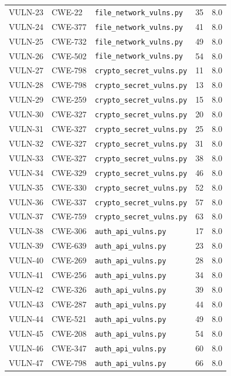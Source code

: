 \documentclass[11pt,a4paper]{article}
\begin{document}
\begin{longtable}{@{}l l l r l@{}}
VULN-23 & CWE-22 & \texttt{file\_network\_vulns.py} & 35 & 8.0 \\
VULN-24 & CWE-377 & \texttt{file\_network\_vulns.py} & 41 & 8.0 \\
VULN-25 & CWE-732 & \texttt{file\_network\_vulns.py} & 49 & 8.0 \\
VULN-26 & CWE-502 & \texttt{file\_network\_vulns.py} & 54 & 8.0 \\
VULN-27 & CWE-798 & \texttt{crypto\_secret\_vulns.py} & 11 & 8.0 \\
VULN-28 & CWE-798 & \texttt{crypto\_secret\_vulns.py} & 13 & 8.0 \\
VULN-29 & CWE-259 & \texttt{crypto\_secret\_vulns.py} & 15 & 8.0 \\
VULN-30 & CWE-327 & \texttt{crypto\_secret\_vulns.py} & 20 & 8.0 \\
VULN-31 & CWE-327 & \texttt{crypto\_secret\_vulns.py} & 25 & 8.0 \\
VULN-32 & CWE-327 & \texttt{crypto\_secret\_vulns.py} & 31 & 8.0 \\
VULN-33 & CWE-327 & \texttt{crypto\_secret\_vulns.py} & 38 & 8.0 \\
VULN-34 & CWE-329 & \texttt{crypto\_secret\_vulns.py} & 46 & 8.0 \\
VULN-35 & CWE-330 & \texttt{crypto\_secret\_vulns.py} & 52 & 8.0 \\
VULN-36 & CWE-337 & \texttt{crypto\_secret\_vulns.py} & 57 & 8.0 \\
VULN-37 & CWE-759 & \texttt{crypto\_secret\_vulns.py} & 63 & 8.0 \\
VULN-38 & CWE-306 & \texttt{auth\_api\_vulns.py} & 17 & 8.0 \\
VULN-39 & CWE-639 & \texttt{auth\_api\_vulns.py} & 23 & 8.0 \\
VULN-40 & CWE-269 & \texttt{auth\_api\_vulns.py} & 28 & 8.0 \\
VULN-41 & CWE-256 & \texttt{auth\_api\_vulns.py} & 34 & 8.0 \\
VULN-42 & CWE-326 & \texttt{auth\_api\_vulns.py} & 39 & 8.0 \\
VULN-43 & CWE-287 & \texttt{auth\_api\_vulns.py} & 44 & 8.0 \\
VULN-44 & CWE-521 & \texttt{auth\_api\_vulns.py} & 49 & 8.0 \\
VULN-45 & CWE-208 & \texttt{auth\_api\_vulns.py} & 54 & 8.0 \\
VULN-46 & CWE-347 & \texttt{auth\_api\_vulns.py} & 60 & 8.0 \\
VULN-47 & CWE-798 & \texttt{auth\_api\_vulns.py} & 66 & 8.0 \\

\end{longtable}
\end{document}

